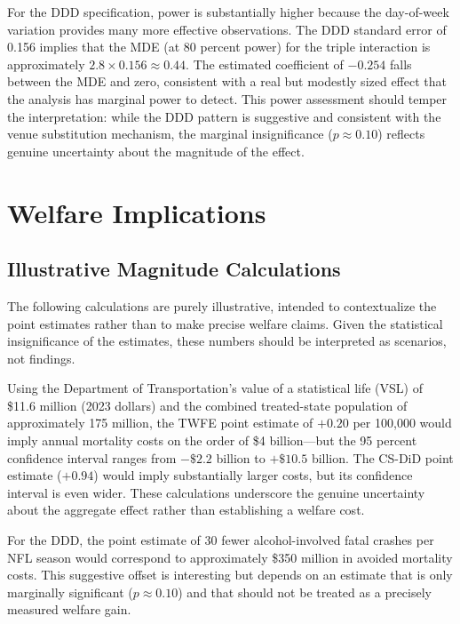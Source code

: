 \documentclass[12pt]{article}
\begin{document}
For the DDD specification, power is substantially higher because the day-of-week variation provides many more effective observations. The DDD standard error of 0.156 implies that the MDE (at 80 percent power) for the triple interaction is approximately $2.8 \times 0.156 \approx 0.44$. The estimated coefficient of $-0.254$ falls between the MDE and zero, consistent with a real but modestly sized effect that the analysis has marginal power to detect. This power assessment should temper the interpretation: while the DDD pattern is suggestive and consistent with the venue substitution mechanism, the marginal insignificance ($p \approx 0.10$) reflects genuine uncertainty about the magnitude of the effect.


\section{Welfare Implications}
\label{sec:welfare}

\subsection{Illustrative Magnitude Calculations}

The following calculations are purely illustrative, intended to contextualize the point estimates rather than to make precise welfare claims. Given the statistical insignificance of the estimates, these numbers should be interpreted as scenarios, not findings.

Using the Department of Transportation's value of a statistical life (VSL) of \$11.6 million (2023 dollars) \citep{dot2023vsl} and the combined treated-state population of approximately 175 million, the TWFE point estimate of $+0.20$ per 100,000 would imply annual mortality costs on the order of \$4 billion---but the 95 percent confidence interval ranges from $-\$2.2$ billion to $+\$10.5$ billion. The CS-DiD point estimate ($+0.94$) would imply substantially larger costs, but its confidence interval is even wider. These calculations underscore the genuine uncertainty about the aggregate effect rather than establishing a welfare cost.

For the DDD, the point estimate of 30 fewer alcohol-involved fatal crashes per NFL season would correspond to approximately \$350 million in avoided mortality costs. This suggestive offset is interesting but depends on an estimate that is only marginally significant ($p \approx 0.10$) and that should not be treated as a precisely measured welfare gain.
\end{document}
